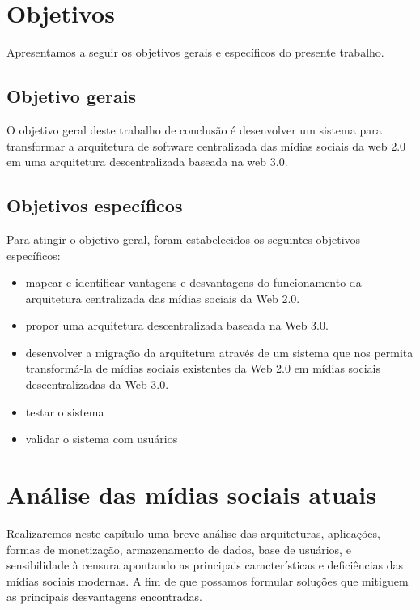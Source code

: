 \chapter{Objetivos}

Apresentamos a seguir os objetivos gerais e específicos do presente trabalho.

\section{Objetivo gerais}

O objetivo geral deste trabalho de conclusão é desenvolver um sistema para transformar a arquitetura de software centralizada das mídias sociais da web 2.0 em uma arquitetura descentralizada baseada na web 3.0.

\section{Objetivos específicos}

Para atingir o objetivo geral, foram estabelecidos os seguintes objetivos específicos:

\begin{itemize}
    \item mapear e identificar vantagens e desvantagens do funcionamento da arquitetura centralizada das mídias sociais da Web 2.0.
    \item propor uma arquitetura descentralizada baseada na Web 3.0.
    \item desenvolver a migração da arquitetura através de um sistema que nos permita transformá-la de mídias sociais existentes da Web 2.0 em mídias sociais descentralizadas da Web 3.0.
    \item testar o sistema
    \item validar o sistema com usuários
\end{itemize}

\chapter{Análise das mídias sociais atuais}

Realizaremos neste capítulo uma breve análise das arquiteturas, aplicações, formas de monetização, armazenamento de dados, base de usuários, e sensibilidade à censura apontando as principais características e deficiências das mídias sociais modernas. 
A fim de que possamos formular soluções que mitiguem as principais desvantagens encontradas.

